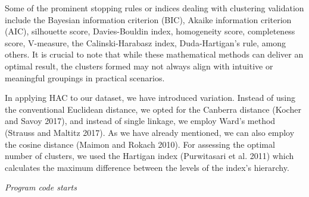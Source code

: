 Some of the prominent stopping rules or indices dealing with clustering
validation include the Bayesian information criterion (BIC), Akaike
information criterion (AIC), silhouette score, Davies-Bouldin index,
homogeneity score, completeness score, V-measure, the Calinski-Harabasz
index, Duda-Hartigan's rule, among others. It is crucial to note that while
these mathematical methods can deliver an optimal result, the clusters
formed may not always align with intuitive or meaningful groupings in
practical scenarios.

In applying HAC to our dataset, we have introduced variation. Instead of using the
conventional Euclidean distance, we opted for the Canberra distance
(Kocher and Savoy 2017), and instead of single linkage, we employ Ward's
method (Strauss and Maltitz 2017). As we have already mentioned, we can
also employ the cosine distance (Maimon and Rokach 2010). For assessing
the optimal number of clusters, we used the Hartigan index
(Purwitasari et al. 2011) which calculates the maximum difference
between the levels of the index's hierarchy.

\emph{Program code starts}

\begin{Shaded}
\begin{Highlighting}[]

\OtherTok{\textless{}{-}} 

\OtherTok{\textless{}{-}}  \NormalTok{)}

\OtherTok{\textless{}{-}}  \NormalTok{)}

\OtherTok{\textless{}{-}}  \NormalTok{, } \NormalTok{, } \NormalTok{, }
               \NormalTok{, } \NormalTok{)}
\end{Highlighting}
\end{Shaded}

